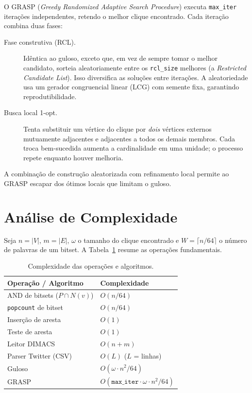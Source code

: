 \documentclass[12pt]{article}
\begin{document}
O GRASP (\emph{Greedy Randomized Adaptive Search Procedure}) executa
\texttt{max\_iter} iterações independentes, retendo o melhor clique encontrado.
Cada iteração combina duas fases:

\begin{description}
  \item[Fase construtiva (RCL).] Idêntica ao guloso, exceto que, em vez de
  sempre tomar o melhor candidato, sorteia aleatoriamente entre os
  \texttt{rcl\_size} melhores (a \emph{Restricted Candidate List}). Isso
  diversifica as soluções entre iterações. A aleatoriedade usa um gerador
  congruencial linear (LCG) com semente fixa, garantindo reprodutibilidade.
  \item[Busca local 1-opt.] Tenta substituir um vértice do clique por
  \emph{dois} vértices externos mutuamente adjacentes e adjacentes a todos os
  demais membros. Cada troca bem-sucedida aumenta a cardinalidade em uma
  unidade; o processo repete enquanto houver melhoria.
\end{description}

A combinação de construção aleatorizada com refinamento local permite ao GRASP
escapar dos ótimos locais que limitam o guloso.

\section{Análise de Complexidade}
\label{sec:complexidade}

Seja $n = |V|$, $m = |E|$, $\omega$ o tamanho do clique encontrado e
$W = \lceil n/64 \rceil$ o número de palavras de um bitset. A
Tabela~\ref{tab:complexidade} resume as operações fundamentais.

\begin{table}[ht]
\centering
\caption{Complexidade das operações e algoritmos.}
\label{tab:complexidade}
\begin{tabular}{l l}
\hline
\textbf{Operação / Algoritmo} & \textbf{Complexidade} \\
\hline
AND de bitsets ($P \cap N(v)$)      & $O(n/64)$ \\
\texttt{popcount} de bitset          & $O(n/64)$ \\
Inserção de aresta                   & $O(1)$ \\
Teste de aresta                      & $O(1)$ \\
\hline
Leitor DIMACS                        & $O(n + m)$ \\
Parser Twitter (CSV)                 & $O(L)$ \footnotesize{($L$ = linhas)} \\
\hline
Guloso                               & $O(\omega \cdot n^2 / 64)$ \\
GRASP                                & $O(\texttt{max\_iter} \cdot \omega \cdot n^2 / 64)$ \\
\hline
\end{tabular}
\end{table}
\end{document}
